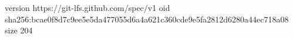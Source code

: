 version https://git-lfs.github.com/spec/v1
oid sha256:bcae0f8d7c9ee5e5da477055d6a4a621c360cde9e5fa2812d6280a44ec718a08
size 204
